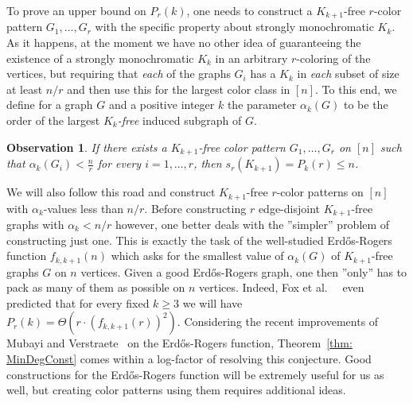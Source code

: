 \documentclass[12pt]{article}
\newtheorem{observation}{Observation}
\theoremstyle{definition}
\begin{document}
	
	To prove an upper bound on $P_r(k)$, one needs to construct a $K_{k+1}$-free $r$-color pattern $G_1, \ldots , G_r$ with the specific property about strongly monochromatic $K_k$. 
	As it happens, at the moment we have no other idea of guaranteeing the existence of a strongly monochromatic $K_k$ in an arbitrary $r$-coloring of the vertices, but requiring that {\em each} of the graphs $G_i$ has a $K_k$ in {\em each} subset of size at least $n/r$ and then use this for the largest color class in $[n]$. 
	To this end, we define for a graph $G$ and a positive integer $k$ the parameter $\alpha_k(G)$ to be the order of the largest $K_k$\textit{-free} induced subgraph of $G$. 
	
	\begin{observation}\cite[Lemma 4.1]{fox2016minimum} \label{obs: ColorPatter}
		If there exists a $K_{k+1}$-free color pattern $G_1, \ldots , G_r$ on $[n]$ such that $\alpha_k(G_i) <\frac{n}{r}$ for every $i=1, \ldots , r$, then 
		$s_r(K_{k+1})=P_k(r) \leq n$.
	\end{observation}
	
	We will also follow this road and construct $K_{k+1}$-free $r$-color patterns on $[n]$ with $\alpha_k$-values less than $n/r$. 
	Before constructing $r$ edge-disjoint $K_{k+1}$-free graphs with $\alpha_k < n/r$ however, one better deals with the ''simpler'' problem of constructing just one. 
	This is exactly the task of the well-studied Erd\H os-Rogers function $f_{k,k+1}(n)$ which asks for the smallest value of $\alpha_k(G)$ of $K_{k+1}$-free graphs $G$ on $n$ vertices. 
	Given a good Erd\H os-Rogers graph, one then ''only'' has to pack as many of them as possible on $n$ vertices.  
	Indeed, Fox et al.\ ~\cite[Conjecture 5.2]{fox2016minimum} even predicted that for every fixed $k\geq 3$ we will have $P_r(k) = \Theta (r \cdot (f_{k,k+1}(r))^2)$. Considering the recent improvements of Mubayi and Verstraete~\cite{mubayi2024order} on the Erd\H os-Rogers function, Theorem~\ref{thm: MinDegConst} comes within a log-factor of resolving this conjecture.
	Good constructions for the Erd\H os-Rogers function will be extremely useful for us as well, but creating color patterns using them requires additional ideas. 
    
\end{document}
